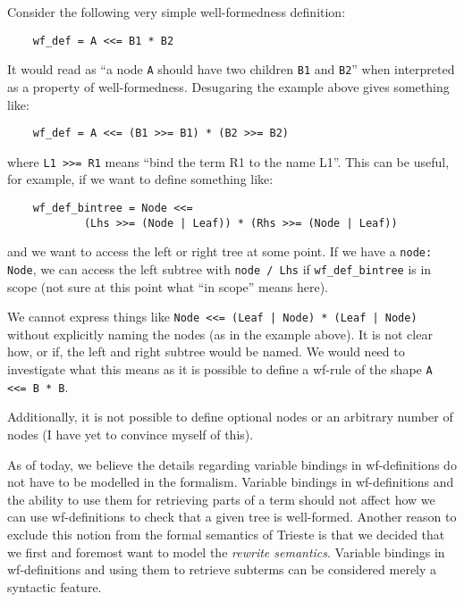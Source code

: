 \documentclass{article}
\begin{document}
Consider the following very simple well-formedness definition:

\begin{verbatim}
    wf_def = A <<= B1 * B2
\end{verbatim}

It would read as ``a node \texttt{A} should have two children \texttt{B1} and \texttt{B2}'' when interpreted as a property of well-formedness. Desugaring the example above gives something like:

\begin{verbatim}
    wf_def = A <<= (B1 >>= B1) * (B2 >>= B2)
\end{verbatim}

where \texttt{L1 >>= R1} means ``bind the term R1 to the name L1''. This can be useful, for example, if we want to define something like:

\begin{verbatim}
    wf_def_bintree = Node <<= 
            (Lhs >>= (Node | Leaf)) * (Rhs >>= (Node | Leaf))
\end{verbatim}
and we want to access the left or right tree at some point. If we have a \texttt{node: Node}, we can access the left subtree with \texttt{node / Lhs} if \texttt{wf_def_bintree} is in scope (not sure at this point what ``in scope'' means here). 

We cannot express things like \texttt{Node <<= (Leaf | Node) * (Leaf | Node)} without explicitly naming the nodes (as in the example above). It is not clear how, or if, the left and right subtree would be named. We would need to investigate what this means as it is possible to define a wf-rule of the shape \texttt{A <<= B * B}. 

Additionally, it is not possible to define optional nodes or an arbitrary number of nodes (I have yet to convince myself of this).

As of today, we believe the details regarding variable bindings in wf-definitions do not have to be modelled in the formalism. Variable bindings in wf-definitions and the ability to use them for retrieving parts of a term should not affect how we can use wf-definitions to check that a given tree is well-formed. Another reason to exclude this notion from the formal semantics of Trieste is that we decided that we first and foremost want to model the \emph{rewrite semantics}. Variable bindings in wf-definitions and using them to retrieve subterms can be considered merely a syntactic feature. 
\end{document}
